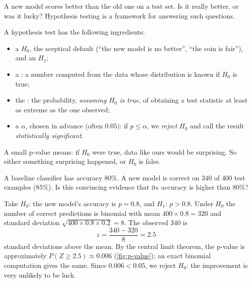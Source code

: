 A new model scores better than the old one on a test set. Is it really better,
or was it lucky? Hypothesis testing is a framework for answering such questions.

\begin{definition}\label{def:hypothesis-test}
A hypothesis test has the following ingredients:
\begin{itemize}
  \item a  $H_0$, the sceptical default (``the new model
    is no better'', ``the coin is fair''), and an 
    $H_1$;
  \item a : a number computed from the data whose
    distribution is known if $H_0$ is true;
  \item the : the probability, \emph{assuming $H_0$ is true}, of
    obtaining a test statistic at least as extreme as the one observed;
  \item a  $\alpha$, chosen in advance (often $0.05$):
    if $p \le \alpha$, we \emph{reject} $H_0$ and call the result
    \emph{statistically significant}.
\end{itemize}
\end{definition}

A small p-value means: if $H_0$ were true, data like ours would be surprising. So
either something surprising happened, or $H_0$ is false.

\begin{example}\label{ex:hypothesis-test}
A baseline classifier has accuracy $80\%$. A new model is correct on $340$ of $400$
test examples ($85\%$). Is this convincing evidence that its accuracy is higher
than $80\%$?

\sol Take $H_0$: the new model's accuracy is $p = 0.8$, and $H_1$: $p > 0.8$. Under
$H_0$ the number of correct predictions is binomial with mean $400\times0.8 = 320$
and standard deviation $\sqrt{400\times0.8\times0.2} = 8$. The observed $340$ is
\[
  z = \frac{340 - 320}{8} = 2.5
\]
standard deviations above the mean. By the central limit theorem, the p-value is
approximately $P(Z \ge 2.5) \approx 0.006$ (\cref{fig:p-value}); an exact
binomial computation gives the same. Since $0.006 < 0.05$, we reject $H_0$: the
improvement is very unlikely to be luck.
\end{example}

